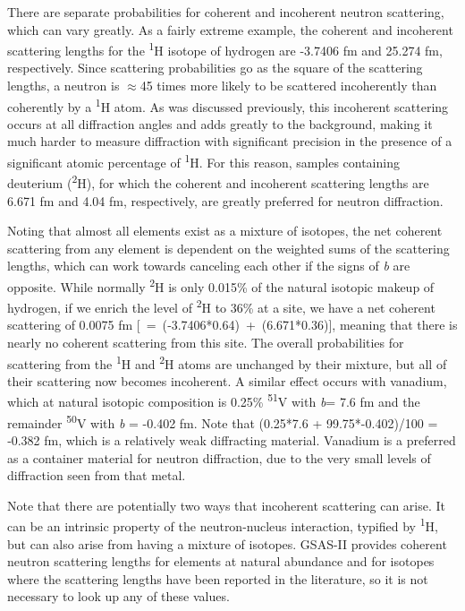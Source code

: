 There are separate probabilities for coherent and incoherent neutron scattering, which can vary greatly. As a fairly extreme example, the coherent and incoherent scattering lengths for the \textsuperscript{1}H isotope of hydrogen are -3.7406 fm and 25.274 fm, respectively. Since scattering probabilities go as the square of the scattering lengths, a neutron is $\approx$45 times more likely to be scattered incoherently than coherently by a \textsuperscript{1}H atom. As was discussed previously, this incoherent scattering occurs at all diffraction angles and adds greatly to the background, making it much harder to measure diffraction with significant precision in the presence of a significant atomic percentage of \textsuperscript{1}H. For this reason, samples containing deuterium (\textsuperscript{2}H), for which the coherent and incoherent scattering lengths are 6.671 fm and 4.04 fm, respectively, are greatly preferred for neutron diffraction. 

Noting that almost all elements exist as a mixture of isotopes, the net coherent scattering from any element is dependent on the weighted sums of the scattering lengths, which can work towards canceling each other if the signs of \textit{b} are opposite. While normally \textsuperscript{2}H is only 0.015\% of the natural isotopic makeup of hydrogen, if we enrich the level of \textsuperscript{2}H to 36\% at a site, we have a net coherent scattering of 0.0075 fm [ = (‑3.7406*0.64) + (6.671*0.36)], meaning that there is nearly no coherent scattering from this site. The overall probabilities for scattering from the \textsuperscript{1}H and \textsuperscript{2}H atoms are unchanged by their mixture, but all of their scattering now becomes incoherent. A similar effect occurs with vanadium, which at natural isotopic composition is 0.25\% \textsuperscript{51}V with \textit{b}= 7.6 fm and the remainder \textsuperscript{50}V with \textit{b} = -0.402 fm. Note that (0.25*7.6 + 99.75*-0.402)/100 = ‑0.382 fm, which is a relatively weak diffracting material. Vanadium is a preferred as a container material for neutron diffraction, due to the very small levels of diffraction seen from that metal. 

Note that there are potentially two ways that incoherent scattering can arise. It can be an intrinsic property of the neutron-nucleus interaction, typified by \textsuperscript{1}H, but can also arise from having a mixture of isotopes. GSAS-II provides coherent neutron scattering lengths for elements at natural abundance and for isotopes where the scattering lengths have been reported in the literature, so it is not necessary to look up any of these values.

